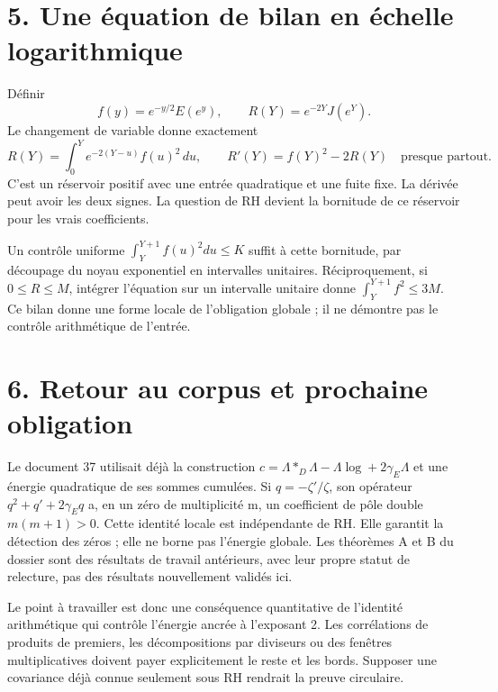 \documentclass[
  11pt,
]{article}
\begin{document}
\hypertarget{une-uxe9quation-de-bilan-en-uxe9chelle-logarithmique}{%
\section{5. Une équation de bilan en échelle
logarithmique}\label{une-uxe9quation-de-bilan-en-uxe9chelle-logarithmique}}

Définir \[
f(y)=e^{-y/2}E(e^y),\qquad R(Y)=e^{-2Y}J(e^Y).
\] Le changement de variable donne exactement \[
R(Y)=\int_0^Y e^{-2(Y-u)}f(u)^2\,du,
\qquad R'(Y)=f(Y)^2-2R(Y)\quad\text{presque partout}.
\] C'est un réservoir positif avec une entrée quadratique et une fuite
fixe. La dérivée peut avoir les deux signes. La question de RH devient
la bornitude de ce réservoir pour les vrais coefficients.

Un contrôle uniforme \(\int_Y^{Y+1}f(u)^2du\le K\) suffit à cette
bornitude, par découpage du noyau exponentiel en intervalles unitaires.
Réciproquement, si \(0\le R\le M\), intégrer l'équation sur un
intervalle unitaire donne \(\int_Y^{Y+1}f^2\le3M\). Ce bilan donne une
forme locale de l'obligation globale ; il ne démontre pas le contrôle
arithmétique de l'entrée.

\hypertarget{retour-au-corpus-et-prochaine-obligation}{%
\section{6. Retour au corpus et prochaine
obligation}\label{retour-au-corpus-et-prochaine-obligation}}

Le document 37 utilisait déjà la construction
\(c=\Lambda*_{D}\Lambda-\Lambda\log+2\gamma_E\Lambda\) et une énergie
quadratique de ses sommes cumulées. Si \(q=-\zeta'/\zeta\), son
opérateur \(q^2+q'+2\gamma_Eq\) a, en un zéro de multiplicité m, un
coefficient de pôle double \(m(m+1)>0\). Cette identité locale est
indépendante de RH. Elle garantit la détection des zéros ; elle ne borne
pas l'énergie globale. Les théorèmes A et B du dossier sont des
résultats de travail antérieurs, avec leur propre statut de relecture,
pas des résultats nouvellement validés ici.

Le point à travailler est donc une conséquence quantitative de
l'identité arithmétique qui contrôle l'énergie ancrée à l'exposant 2.
Les corrélations de produits de premiers, les décompositions par
diviseurs ou des fenêtres multiplicatives doivent payer explicitement le
reste et les bords. Supposer une covariance déjà connue seulement sous
RH rendrait la preuve circulaire.
\end{document}
